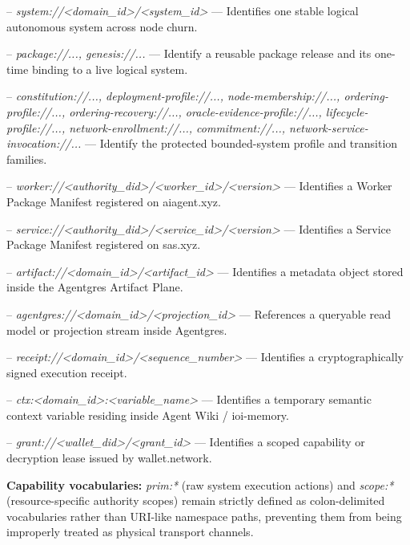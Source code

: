 \documentclass[
  11pt,
]{article}
\begin{document}
--
\emph{system://\textless domain\_id\textgreater/\textless system\_id\textgreater{}}
--- Identifies one stable logical autonomous system across node churn.

--
\emph{package://..., genesis://...}
--- Identify a reusable package release and its one-time binding to a live
logical system.

--
\emph{constitution://..., deployment-profile://..., node-membership://...,
ordering-profile://..., ordering-recovery://..., oracle-evidence-profile://...,
lifecycle-profile://..., network-enrollment://..., commitment://...,
network-service-invocation://...}
--- Identify the protected bounded-system profile and transition families.

--
\emph{worker://\textless authority\_did\textgreater/\textless worker\_id\textgreater/\textless version\textgreater{}}
--- Identifies a Worker Package Manifest registered on aiagent.xyz.

--
\emph{service://\textless authority\_did\textgreater/\textless service\_id\textgreater/\textless version\textgreater{}}
--- Identifies a Service Package Manifest registered on sas.xyz.

--
\emph{artifact://\textless domain\_id\textgreater/\textless artifact\_id\textgreater{}}
--- Identifies a metadata object stored inside the Agentgres Artifact
Plane.

--
\emph{agentgres://\textless domain\_id\textgreater/\textless projection\_id\textgreater{}}
--- References a queryable read model or projection stream inside
Agentgres.

--
\emph{receipt://\textless domain\_id\textgreater/\textless sequence\_number\textgreater{}}
--- Identifies a cryptographically signed execution receipt.

--
\emph{ctx:\textless domain\_id\textgreater:\textless variable\_name\textgreater{}}
--- Identifies a temporary semantic context variable residing inside
Agent Wiki / ioi-memory.

--
\emph{grant://\textless wallet\_did\textgreater/\textless grant\_id\textgreater{}}
--- Identifies a scoped capability or decryption lease issued by
wallet.network.

\textbf{Capability vocabularies:} \emph{prim:*} (raw system execution
actions) and \emph{scope:*} (resource-specific authority scopes) remain
strictly defined as colon-delimited vocabularies rather than URI-like
namespace paths, preventing them from being improperly treated as
physical transport channels.
\end{document}
